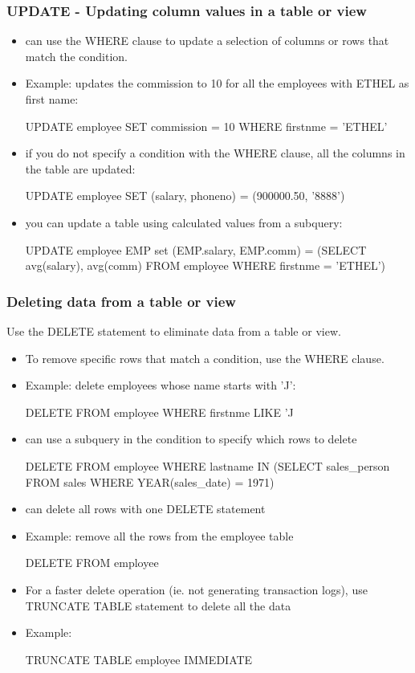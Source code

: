 \documentclass{article}
\begin{document}
\subsubsection{UPDATE - Updating column values in a table or view}
\begin{itemize}
\item can use the WHERE clause to update a selection of columns or rows that match the condition.
\item Example: updates the commission to 10 for all the employees with ETHEL as first name:
\begin{sqlcode}
UPDATE employee SET commission = 10 WHERE firstnme = 'ETHEL'
\end{sqlcode}
\item if you do not specify a condition with the WHERE clause, all the columns in the table are updated:
\begin{sqlcode}
UPDATE employee SET (salary, phoneno) = (900000.50, '8888')
\end{sqlcode}
\item you can update a table using calculated values from a subquery:
\begin{sqlcode}
UPDATE employee EMP set (EMP.salary, EMP.comm) = 
 (SELECT avg(salary), avg(comm) FROM employee WHERE firstnme = 'ETHEL')
\end{sqlcode}
\end{itemize}

\subsubsection{Deleting data from a table or view}
Use the DELETE statement to eliminate data from a table or view.
\begin{itemize}
\item To remove specific rows that match a condition, use the WHERE clause.
\item Example: delete employees whose name starts with 'J':
\begin{sqlcode}
DELETE FROM employee WHERE firstnme LIKE 'J%
\end{sqlcode}
\item can use a subquery in the condition to specify which rows to delete
\begin{sqlcode}
DELETE FROM employee WHERE lastname IN (SELECT sales_person FROM sales WHERE YEAR(sales_date) = 1971)
\end{sqlcode}
\item can delete all rows with one DELETE statement
\item Example: remove all the rows from the employee table
\begin{sqlcode}
DELETE FROM employee
\end{sqlcode}
\item For a faster delete operation (ie. not generating transaction logs), use TRUNCATE TABLE statement
to delete all the data
\item Example:
\begin{sqlcode}
TRUNCATE TABLE employee IMMEDIATE
\end{sqlcode}
\end{itemize}
\end{document}
